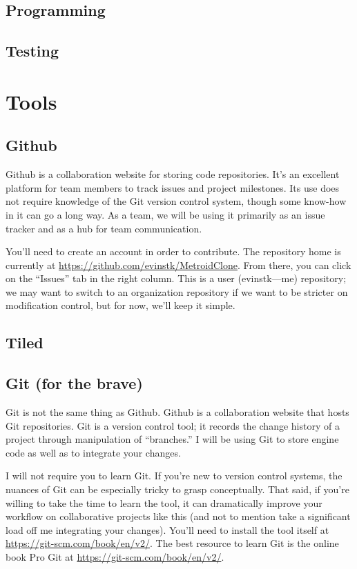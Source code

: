 \documentclass{article}
\begin{document}
\subsection*{Programming}

\subsection*{Testing}

\section{Tools}

\subsection*{Github}
Github is a collaboration website for storing code repositories. It's an excellent platform for team members to track issues and project milestones. Its use does not require knowledge of the Git version control system, though some know-how in it can go a long way. As a team, we will be using it primarily as an issue tracker and as a hub for team communication.

You'll need to create an account in order to contribute. The repository home is currently at \url{https://github.com/evinstk/MetroidClone}. From there, you can click on the ``Issues'' tab in the right column. This is a user (evinstk---me) repository; we may want to switch to an organization repository if we want to be stricter on modification control, but for now, we'll keep it simple.

\subsection*{Tiled}

\subsection*{Git (for the brave)}
Git is not the same thing as Github. Github is a collaboration website that hosts Git repositories. Git is a version control tool; it records the change history of a project through manipulation of ``branches.'' I will be using Git to store engine code as well as to integrate your changes.

I will not require you to learn Git. If you're new to version control systems, the nuances of Git can be especially tricky to grasp conceptually. That said, if you're willing to take the time to learn the tool, it can dramatically improve your workflow on collaborative projects like this (and not to mention take a significant load off me integrating your changes). You'll need to install the tool itself at \url{https://git-scm.com/book/en/v2/}. The best resource to learn Git is the online book Pro Git at \url{https://git-scm.com/book/en/v2/}.
\end{document}
